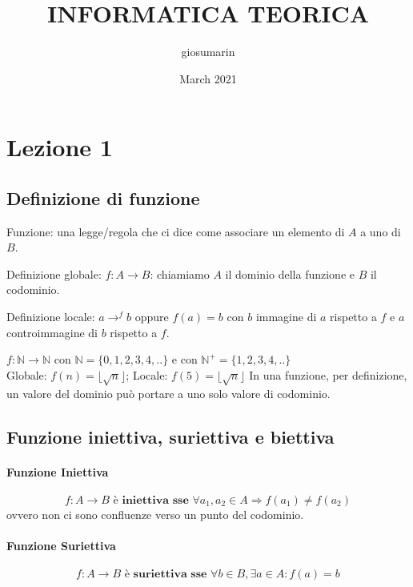 \documentclass{article}
\title{INFORMATICA TEORICA}
\author{giosumarin}
\date{March 2021}
\begin{document}
\maketitle

\section{Lezione 1}
\subsection{Definizione di funzione}

Funzione: una legge/regola che ci dice come associare un elemento di $A$ a uno di $B$.


\noindent
Definizione globale: $f:A\rightarrow B$: chiamiamo $A$ il dominio della funzione e $B$ il codominio.


\noindent
Definizione locale: $a\rightarrow^f b$ oppure $f(a)=b$ con $b$ immagine di $a$ rispetto a $f$ e $a$ controimmagine di $b$ rispetto a $f$. 


\noindent
$f:\mathbb{N} \rightarrow \mathbb{N}$ con $\mathbb{N}=\{0,1,2,3,4,..\}$ e con $\mathbb{N}^+=\{1,2,3,4,..\}$
\\
Globale: $f(n)=\lfloor \sqrt{n} \rfloor$; Locale: $f(5)=\lfloor \sqrt{n} \rfloor$
In una funzione, per definizione, un valore del dominio può portare a uno solo valore di codominio.

\subsection{Funzione iniettiva, suriettiva e biettiva}
\paragraph{Funzione Iniettiva}
\begin{displaymath}\label{iniettiva}
f:A\rightarrow B \textbf{ è iniettiva sse } \forall a_1, a_2 \in A \Rightarrow f(a_1) \neq f(a_2)
\end{displaymath}
ovvero non ci sono confluenze verso un punto del codominio.

\paragraph{Funzione Suriettiva}
\begin{displaymath}\label{suriettiva}
f:A\rightarrow B \textbf{ è suriettiva sse } \forall b \in B,  \exists a \in A: f(a)=b
\end{displaymath}
\end{document}
